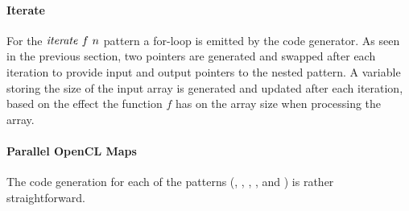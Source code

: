\paragraph{Iterate}
For the $\text{\textit{iterate}}\ f\ n$ pattern a for-loop is emitted by the code generator.
As seen in the previous section, two pointers are generated and swapped after each iteration to provide input and output pointers to the nested pattern.
A variable storing the size of the input array is generated and updated after each iteration, based on the effect the function $f$ has on the array size when processing the array.


\paragraph{Parallel OpenCL Maps}
The \OpenCL code generation for each of the \map patterns (\mapWorkgroup, \mapLocal, \mapGlobal, \mapWarp, and \mapLane) is rather straightforward.


